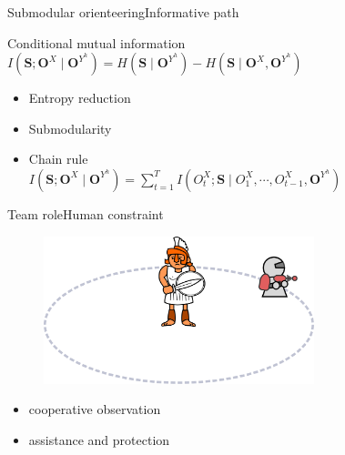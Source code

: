\begin{frame}{Submodular orienteering}{Informative path}
	
	\begin{block}{Conditional mutual information}
		$ I(\mathbf{S}; \mathbf{O}^{X} \mid \mathbf{O}^{Y^{h}}) = H(\mathbf{S} \mid \mathbf{O}^{Y^{h}}) - H(\mathbf{S} \mid \mathbf{O}^{X},\mathbf{O}^{Y^{h}}) $
	\end{block} 
	
	\bigskip
	
	\begin{itemize}
		\item Entropy reduction
		\item Submodularity
		\item Chain rule \\
		$ I(\mathbf{S}; \mathbf{O}^{X} \mid \mathbf{O}^{Y^{h}}) = \sum_{t=1}^{T} I(O^{X}_{t} ; \mathbf{S} \mid O^{X}_{1} , \cdots , O^{X}_{t-1}, \mathbf{O}^{Y^{h}}) $
	\end{itemize}
	
\end{frame}


\begin{frame}{Team role}{Human constraint}
	
	\begin{figure}
		\centering
		\includegraphics[width = 0.7\textwidth]{./figure/human_robot_interaction}
	\end{figure}
	
	\begin{itemize}
		\item cooperative observation
		\item assistance and protection
	\end{itemize}
	
\end{frame}

